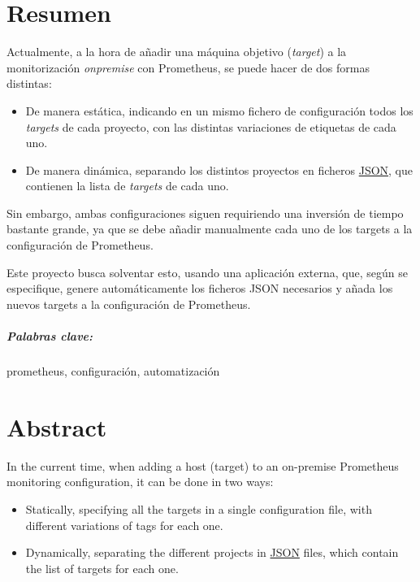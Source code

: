 \chapter*{Resumen}
\label{ch:resumen}

Actualmente, a la hora de añadir una máquina objetivo (\textit{target}) a la monitorización \textit{onpremise} con Prometheus, se puede hacer de dos formas distintas:

\begin{itemize}
  \item De manera estática, indicando en un mismo fichero de configuración todos los \textit{targets} de cada proyecto, con las distintas variaciones de etiquetas de cada uno.
  \item De manera dinámica, separando los distintos proyectos en ficheros \url{JSON}, que contienen la lista de \textit{targets} de cada uno.
\end{itemize}

Sin embargo, ambas configuraciones siguen requiriendo una inversión de tiempo bastante grande, ya que se debe añadir manualmente cada uno de los targets a la configuración de Prometheus.

Este proyecto busca solventar esto, usando una aplicación externa, que, según se especifique, genere automáticamente los ficheros JSON necesarios y añada los nuevos targets a la configuración de Prometheus.

\paragraph*{Palabras clave:} prometheus, configuración, automatización


\newpage
    
\chapter*{Abstract}
\label{ch:abstract}
In the current time, when adding a host (target) to an on-premise Prometheus monitoring configuration, it can be done in two ways:
\begin{itemize}
  \item Statically, specifying all the targets in a single configuration file, with different variations of tags for each one.
  \item Dynamically, separating the different projects in \url{JSON} files, which contain the list of targets for each one.
\end{itemize}

